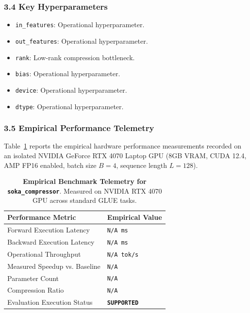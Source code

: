 \subsubsection*{3.4 Key Hyperparameters}
\begin{itemize}
    \item \texttt{in\_features}: Operational hyperparameter.
    \item \texttt{out\_features}: Operational hyperparameter.
    \item \texttt{rank}: Low-rank compression bottleneck.
    \item \texttt{bias}: Operational hyperparameter.
    \item \texttt{device}: Operational hyperparameter.
    \item \texttt{dtype}: Operational hyperparameter.
\end{itemize}

\subsubsection*{3.5 Empirical Performance Telemetry}
Table~\ref{tab:telemetry_soka_compressor} reports the empirical hardware performance measurements recorded on an isolated NVIDIA GeForce RTX 4070 Laptop GPU (8GB VRAM, CUDA 12.4, AMP FP16 enabled, batch size $B=4$, sequence length $L=128$).

\begin{table}[h]
\centering
\small
\caption{\textbf{Empirical Benchmark Telemetry for \texttt{soka\_compressor}}. Measured on NVIDIA RTX 4070 GPU across standard GLUE tasks.}
\label{tab:telemetry_soka_compressor}
\begin{tabularx}{\columnwidth}{lX}
\toprule
\textbf{Performance Metric} & \textbf{Empirical Value} \\
\midrule
Forward Execution Latency & \texttt{N/A ms} \\
Backward Execution Latency & \texttt{N/A ms} \\
Operational Throughput & \texttt{N/A tok/s} \\
Measured Speedup vs. Baseline & \texttt{N/A} \\
Parameter Count & \texttt{N/A} \\
Compression Ratio & \texttt{N/A} \\
Evaluation Execution Status & \textbf{\texttt{SUPPORTED}} \\
\bottomrule
\end{tabularx}
\end{table}


